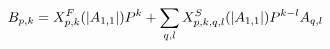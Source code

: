 \documentclass[preview]{standalone}
\begin{document}
\begin{align*}
\special{dvisvgm:raw <g id='unique000'>}B_{p,k}=X_{p,k}^{F}(|A_{1,1}|)P^{k}+\sum_{q,l}X_{p,k,q,l}^{S}(|A_{1,1}|)P^{k-l}A_{q,l}\special{dvisvgm:raw </g>}
\end{align*}
\end{document}
